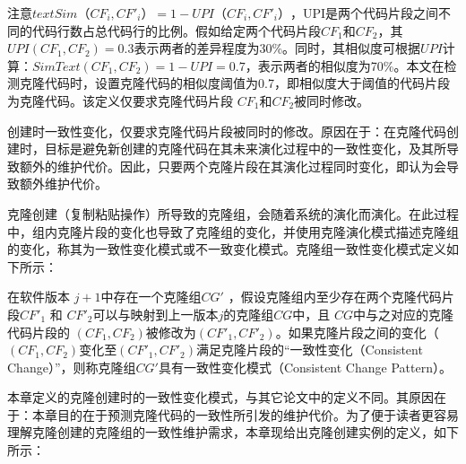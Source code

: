 


注意$\mathit {textSim}（CF_i, CF'_i）= 1 - UPI（CF_i, CF'_i）$，UPI是两个代码片段之间不同的代码行数占总代码行的比例。假如给定两个代码片段$CF_1$和$CF_2$，其$UPI(CF_1,CF_2)=0.3$表示两者的差异程度为30\%。同时，其相似度可根据$UPI$计算：$SimText (CF_1,CF_2)=1-UPI=0.7$，表示两者的相似度为70\%。本文在检测克隆代码时，设置克隆代码的相似度阈值为0.7，即相似度大于阈值的代码片段为克隆代码。该定义仅要求克隆代码片段 $ CF_1 $和$CF_2 $被同时修改。

创建时一致性变化，仅要求克隆代码片段被同时的修改。原因在于：在克隆代码创建时，目标是避免新创建的克隆代码在其未来演化过程中的一致性变化，及其所导致额外的维护代价。因此，只要两个克隆片段在其演化过程同时变化，即认为会导致额外维护代价。

克隆创建（复制粘贴操作）所导致的克隆组，会随着系统的演化而演化。在此过程中，组内克隆片段的变化也导致了克隆组的变化，并使用克隆演化模式描述克隆组的变化，称其为一致性变化模式或不一致变化模式。克隆组一致性变化模式定义如下所示：

\begin{definition}
\label{def-cloningpattern}
在软件版本 $j+1$中存在一个克隆组$CG'$ ，假设克隆组内至少存在两个克隆代码片段$CF'_1$ 和 $CF'_2$可以与映射到上一版本$j$的克隆组$CG$中，且 $CG$中与之对应的克隆代码片段的 $(CF_1,CF_2)$被修改为$(CF'_1,CF'_2)$。如果克隆片段之间的变化（ $(CF_1,CF_2)$变化至$(CF'_1,CF'_2)$满足克隆片段的“一致性变化（Consistent Change）”，则称克隆组$CG'$具有一致性变化模式（Consistent Change Pattern）。
\end{definition}


本章定义的克隆创建时的一致性变化模式，与其它论文中的定义不同。其原因在于：本章目的在于预测克隆代码的一致性所引发的维护代价。为了便于读者更容易理解克隆创建的克隆组的一致性维护需求，本章现给出克隆创建实例的定义，如下所示：

